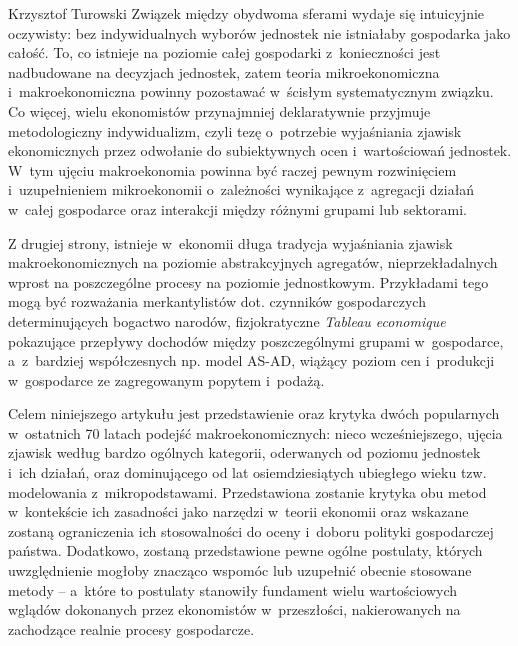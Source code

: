 \begin{artplenv}{Krzysztof Turowski}
Związek między obydwoma sferami wydaje się intuicyjnie oczywisty: bez indywidualnych wyborów jednostek nie istniałaby
gospodarka jako całość. To, co istnieje na poziomie całej gospodarki z~konieczności jest nadbudowane na decyzjach
jednostek, zatem teoria mikroekonomiczna i~makroekonomiczna powinny pozostawać w~ścisłym systematycznym związku. Co
więcej, wielu ekonomistów przynajmniej deklaratywnie przyjmuje metodologiczny indywidualizm, czyli tezę o~potrzebie
wyjaśniania zjawisk ekonomicznych przez odwołanie do subiektywnych ocen i~wartościowań jednostek.  W~tym ujęciu
makroekonomia powinna być raczej pewnym rozwinięciem i~uzupełnieniem mikroekonomii o~zależności wynikające z~agregacji
działań w~całej gospodarce oraz interakcji między różnymi grupami lub sektorami.

Z drugiej strony, istnieje w~ekonomii długa tradycja wyjaśniania zjawisk makroekonomicznych na poziomie abstrakcyjnych
agregatów, nieprzekładalnych wprost na poszczególne procesy na poziomie jednostkowym. Przykładami tego mogą być
rozważania merkantylistów dot. czynników gospodarczych determinujących bogactwo narodów, fizjokratyczne \textit{Tableau
economique} pokazujące przepływy dochodów między poszczególnymi grupami w~gospodarce, a~z~bardziej współczesnych np.
model AS-AD, wiążący poziom cen i~produkcji w~gospodarce ze zagregowanym popytem i~podażą.

Celem niniejszego artykułu jest przedstawienie oraz krytyka dwóch popularnych w~ostatnich 70 latach podejść
makroekonomicznych: nieco wcześniejszego, ujęcia zjawisk według bardzo ogólnych kategorii, oderwanych od poziomu
jednostek i~ich działań, oraz dominującego od lat osiemdziesiątych ubiegłego wieku tzw. modelowania z~mikropodstawami.
Przedstawiona zostanie krytyka obu metod w~kontekście ich zasadności jako narzędzi w~teorii ekonomii oraz wskazane
zostaną ograniczenia ich stosowalności do oceny i~doboru polityki gospodarczej państwa. Dodatkowo, zostaną
przedstawione pewne ogólne postulaty, których uwzględnienie mogłoby znacząco wspomóc lub uzupełnić obecnie stosowane
metody -- a~które to postulaty stanowiły fundament wielu wartościowych wglądów dokonanych przez
ekonomistów w~przeszłości, nakierowanych na zachodzące realnie procesy gospodarcze.


\end{artplenv}
